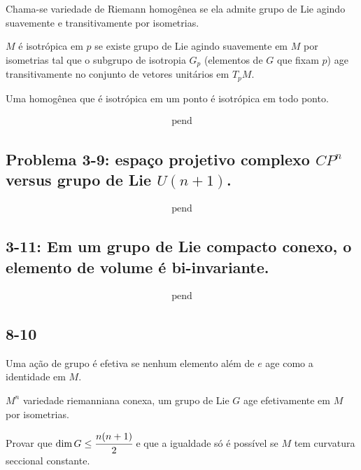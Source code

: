 \documentclass[10pt,a4paper]{article}
\begin{document}
		Chama-se variedade de Riemann homog\^enea se ela admite grupo de Lie agindo suavemente e transitivamente por isometrias.

		$M$ \'e isotr\'opica em $p$ se existe grupo de Lie agindo suavemente em $M$ por isometrias tal que o subgrupo de isotropia $G_p$ (elementos de $G$ que fixam $p$) age transitivamente no conjunto de vetores unit\'arios em $T_pM$.

		Uma homog\^enea que \'e isotr\'opica em um ponto \'e isotr\'opica em todo ponto.

		\begin{align}
		\text{pend}
		\end{align}

		\subsection{Problema 3-9: espa\c{c}o projetivo complexo $CP^n$ versus grupo de Lie $U(n + 1)$.}
		\begin{flushright}
		\end{flushright}

		\begin{align}
		\text{pend}
		\end{align}

		\subsection{3-11: Em um grupo de Lie compacto conexo, o elemento de volume \'e bi-invariante.}
		\begin{flushright}
		\end{flushright}

		\begin{align}
		\text{pend}
		\end{align}

		\subsection{8-10}
		\begin{flushright}
		\end{flushright}

		Uma a\c{c}\~ao de grupo \'e efetiva se nenhum elemento al\'em de $e$ age como a identidade em $M$.

		$M^n$ variedade riemanniana conexa, um grupo de Lie $G$ age efetivamente em $M$ por isometrias.

		Provar que $\dim G \le \cfrac{n(n+1)}{2}$ e que a igualdade s\'o \'e poss\'ivel se $M$ tem curvatura seccional constante.
\end{document}
